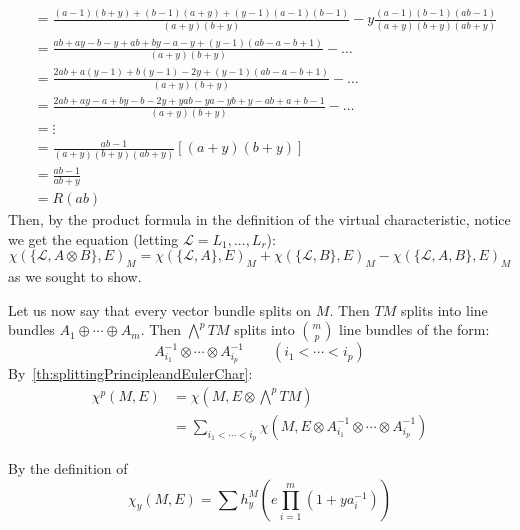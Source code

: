 \documentclass{book}
\newenvironment{Proof}[1][]
  {\begin{ProofTcb}[#1]}
  {\end{ProofTcb}}
\newcommand{\CL}{{\mathcal{L}}}
\begin{document}
\begin{Proof}
\begin{align*}
  &= \frac{(a-1)(b+y) + (b-1)(a+y) + (y-1)(a-1)(b-1)}{(a+y)(b+y)} - y \frac{(a-1)(b-1)(ab-1)}{(a+y)(b+y)(ab+y)} \\
  &= \frac{ab+ay-b-y + ab+by-a-y + (y-1)(ab-a-b+1)}{(a+y)(b+y)} - \dots \\
  &= \frac{2ab+a(y-1)+b(y-1)-2y + (y-1)(ab-a-b+1)}{(a+y)(b+y)} - \dots \\
  &= \frac{2ab+ay-a+by-b-2y + yab-ya-yb+y-ab+a+b-1}{(a+y)(b+y)} - \dots \\
  &= \vdots\\
  &= \frac{ab-1}{(a+y)(b+y)(ab+y)} \left[ (a+y)(b+y) \right] \\
  &= \frac{ab-1}{ab+y} \\
  &= R(ab)
  \end{align*}
  Then, by the product formula in the definition of the virtual characteristic, notice we get the equation (letting $\CL = L_1, ..., L_r$):
\[
  \chi(\{\CL, A\otimes B\}, E)_M = \chi(\{\CL,A\}, E)_M + \chi(\{\CL, B\}, E)_M - \chi(\{\CL, A,B\}, E)_M
\]
  as we sought to show.
\end{Proof}

Let us now say that every vector bundle splits on $M$. Then $TM$ splits into line bundles $A_1\oplus \cdots
\oplus A_m$. Then $\bigwedge^p TM$ splits into $\binom{m}{p}$ line bundles of the form:
\[
  A_{i_1}^{-1}\otimes \cdots \otimes A_{i_p}^{-1} \qquad (i_1 < \cdots < i_p)
\]
By~\cref{th:splittingPrincipleandEulerChar}:
\begin{align*}
  \chi^p(M, E) &= \chi(M, E\otimes \bigwedge^p TM)\\
               &= \sum_{i_1 < \cdots < i_p} \chi(M, E\otimes A_{i_1}^{-1}\otimes \cdots \otimes A_{i_p}^{-1})
\end{align*}

  By the definition of
\[
  \chi_y(M, E) = \sum h_y^M \left(e \prod_{i=1}^m (1+ya_i^{-1})\right)
\]
\end{document}
